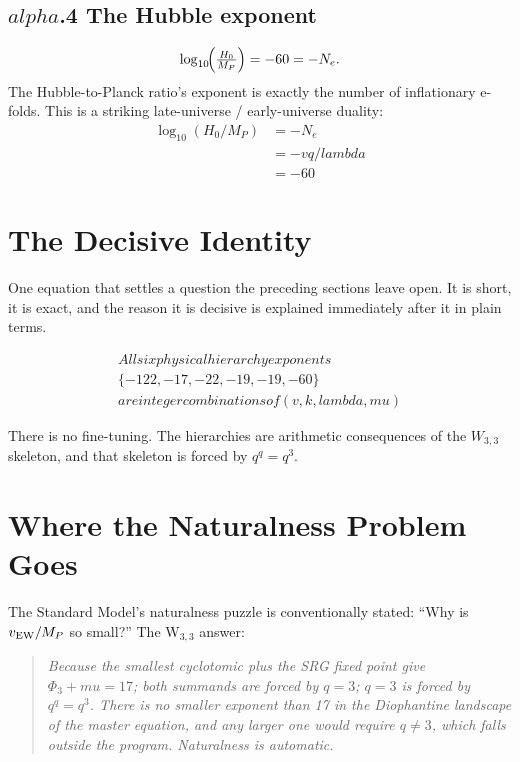 \documentclass[12pt,a4paper]{article}
\def\text#1{#1}%
\def\alpha{alpha}%
\def\lambda{lambda}%
\def\mu{mu}%
\def\Phi#1{Phi#1}%
\theoremstyle{definition}
\begin{document}
\subsection*{$\alpha$.4 \quad The Hubble exponent}
\[
\log_{10}\!\Bigl(\tfrac{H_0}{M_P}\Bigr) = -60 = -N_e.
\]
The Hubble-to-Planck ratio's exponent is exactly the number of
inflationary e-folds. This is a striking late-universe / early-universe
duality:
\[
\boxed{\;
\begin{aligned}
\log_{10}(H_0/M_P) &= -N_e \\
                    &= -vq/\lambda \\
                    &= -60
\end{aligned}
\;}
\]

\section*{The Decisive Identity}

\begin{plainbox}
One equation that settles a question the preceding sections leave open. It is short,
it is exact, and the reason it is decisive is explained immediately after it in plain
terms.
\end{plainbox}


\[
\boxed{\;
\begin{array}{c}
\text{All six physical hierarchy exponents} \\
\{-122,-17,-22,-19,-19,-60\} \\
\text{are integer combinations of } (v,k,\lambda,\mu)
\end{array}
\;}
\]

There is no fine-tuning. The hierarchies are arithmetic consequences
of the $W_{3,3}$ skeleton, and that skeleton is forced by $q^q = q^3$.

\section*{Where the Naturalness Problem Goes}

The Standard Model's naturalness puzzle is conventionally stated:
``Why is $v_{\rm EW}/M_P$ so small?'' The W$_{3,3}$ answer:
\begin{quote}\em
Because the smallest cyclotomic plus the SRG fixed point give
$\Phi_3+\mu=17$; both summands are forced by $q=3$; $q=3$ is forced
by $q^q=q^3$. There is no smaller exponent than 17 in the Diophantine
landscape of the master equation, and any larger one would require
$q\ne 3$, which falls outside the program. Naturalness is automatic.
\end{quote}
\end{document}
